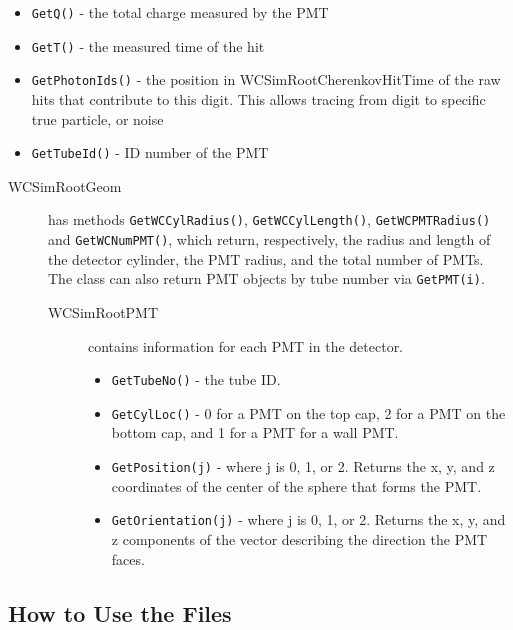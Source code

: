 \begin{description}
\begin{description}
\begin{description}
          \begin{itemize}
          \item \texttt{GetQ()} - the total charge measured by the PMT
          \item \texttt{GetT()} - the measured time of the hit
          \item \texttt{GetPhotonIds()} - the position in WCSimRootCherenkovHitTime of the raw hits that contribute to this digit. This allows tracing from digit to specific true particle, or noise
          \item \texttt{GetTubeId()} - ID number of the PMT
          \end{itemize}
    \end{description}
  \end{description}
\end{description}


\begin{description}
  \item[WCSimRootGeom]  has methods \texttt{GetWCCylRadius()}, \texttt{GetWCCylLength()}, \texttt{GetWCPMTRadius()} and \texttt{GetWCNumPMT()}, which return, respectively, the radius and length of the detector cylinder, the PMT radius, and the total number of PMTs.  The class can also return PMT objects by tube number via \texttt{GetPMT(i)}.
    \begin{description}
    \item[WCSimRootPMT] contains information for each PMT in the detector.
    	\begin{itemize}
                \item \texttt{GetTubeNo()} - the tube ID.
		\item \texttt{GetCylLoc()} - 0 for a PMT on the top cap, 2 for a PMT on the bottom  cap, and 1 for a PMT for a wall PMT.
		\item \texttt{GetPosition(j)} - where j is 0, 1, or 2.  Returns the x, y, and z coordinates of the center of the sphere that forms the PMT.
		\item \texttt{GetOrientation(j)} - where j is 0, 1, or 2.  Returns the x, y, and z components of the vector describing the direction the PMT faces.
         \end{itemize}
    \end{description}
\end{description}


\subsection{How to Use the Files}

